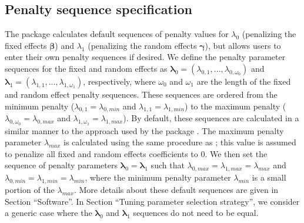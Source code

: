 \subsection{Penalty sequence specification}
The  package calculates default sequences of
penalty values for \(\lambda_0\) (penalizing the fixed effects
\(\boldsymbol \beta\)) and \(\lambda_1\) (penalizing the random effects
\(\boldsymbol \gamma\)), but allows users to enter their own
penalty sequences if desired.  We define the penalty parameter sequences for the fixed and random effects as
\(\boldsymbol \lambda_0 = (\lambda_{0,1},...,\lambda_{0,\omega_0})\) and
\(\boldsymbol \lambda_1 = (\lambda_{1,1},...,\lambda_{1,\omega_1})\), respectively, where $\omega_0$ and $\omega_1$ are the length of the fixed and random effect penalty sequences. These sequences are ordered from the minimum penalty ($\lambda_{0,1} = \lambda_{0,min}$ and $\lambda_{1,1} = \lambda_{1,min}$) to the maximum penalty ($\lambda_{0,\omega_0} = \lambda_{0,max}$ and $\lambda_{1,\omega_1} = \lambda_{1,max}$). By default, these sequences are calculated in a similar manner to the approach used by the package  \citep{ncvreg2011}. The maximum penalty parameter
\(\lambda_{max}\) is calculated using the same procedure as ; this value is assumed to penalize all fixed and random effects
coefficients to 0. We then set the sequence of penalty
parameters \(\boldsymbol \lambda_0 = \boldsymbol \lambda_1\) such that $\lambda_{0,max} = \lambda_{1,max} = 
\lambda_{max}$ and $\lambda_{0,min} = \lambda_{1,min} = \lambda_{min}$, where the minimum penalty parameter \(\lambda_{min}\) is a
small portion of the \(\lambda_{max}\). More details about these default sequences are given in Section ``Software''. In Section ``Tuning parameter selection strategy'', we consider a generic case where the $\boldsymbol \lambda_0$ and $\boldsymbol \lambda_1$ sequences do not need to be equal.

